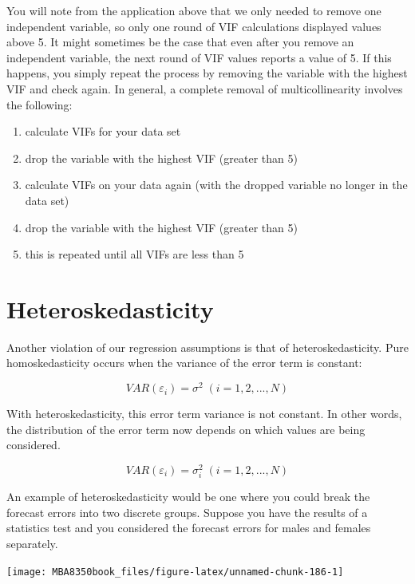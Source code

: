 \documentclass[
]{book}
\begin{document}
You will note from the application above that we only needed to remove one independent variable, so only one round of VIF calculations displayed values above 5. It might sometimes be the case that even after you remove an independent variable, the next round of VIF values reports a value of 5. If this happens, you simply repeat the process by removing the variable with the highest VIF and check again. In general, a complete removal of multicollinearity involves the following:

\begin{enumerate}
\def\labelenumi{\arabic{enumi}.}
\item
  calculate VIFs for your data set
\item
  drop the variable with the highest VIF (greater than 5)
\item
  calculate VIFs on your data again (with the dropped variable no longer in the data set)
\item
  drop the variable with the highest VIF (greater than 5)
\item
  this is repeated until all VIFs are less than 5
\end{enumerate}

\hypertarget{heteroskedasticity}{%
\section{Heteroskedasticity}\label{heteroskedasticity}}

Another violation of our regression assumptions is that of heteroskedasticity. Pure homoskedasticity occurs when the variance of the error term is constant:

\[VAR (\varepsilon_i ) = \sigma^2 \;(i = 1, 2, ...,N)\]

With heteroskedasticity, this error term variance is not constant. In other words, the distribution of the error term now depends on which values are being considered.

\[VAR (\varepsilon_i ) = \sigma_i^2 \;(i = 1, 2, ...,N)\]

An example of heteroskedasticity would be one where you could break the forecast errors into two discrete groups. Suppose you have the results of a statistics test and you considered the forecast errors for males and females separately.

\begin{center}\texttt{[image: MBA8350book\_files/figure-latex/unnamed-chunk-186-1]} \end{center}
\end{document}

